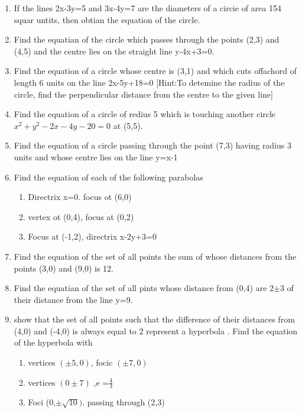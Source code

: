 \documentclass[12pt]{article}
\begin{document}
\begin{enumerate}
\item If the lines 2x-3y=5 and 3x-4y=7 are the diameters of a circie of area 154 squar untits, then obtian the equation of the circle.
\item Find the equatian of the circle which passes through the points (2,3) and (4,5) and the centre lies on the straight line y-4x+3=0.
\item Find the equation of a circle whose centre is (3,1) and which cuts offachord of length  6 units on the  line 2x-5y+18=0
[Hint:To detemine the radius of the circle, find the perpendicular distance from the centre to the given line]
\item Find the equation of a circle of redius 5 which is touching another circle $x^2+y^2-2x-4y-20=0$ at (5,5).
\item Find the equation of a circle passing through the point (7,3) having radius 3 units and whose centre lies on the line y=x-1
\item Find the equation of each of the following parabolas
\begin{enumerate}
\item  Directrix x=0. focus ot (6,0)
\item  vertex  ot (0,4), focus at (0,2)
\item  Focus at (-1,2), directrix x-2y+3=0
\end{enumerate}
\item Find the equation of the set of all points the sum of whose distances  from the points (3,0) and (9,0) is 12.
\item Find the equatian of the set of all pints whose distance from (0,4) are 2$\pm$3 of their distance from the line y=9.
\item show that the set of all points such that the difference of their distances from (4,0) and (-4,0) is always equal to 2 represent a hyperbola .
 Find the equation of the hyperbola with
 \begin{enumerate}
	 \item  vertices $(\pm5,0)$, focic $(\pm 7,0)$
	 \item vertices $(0\pm7)$ ,e =$\frac{4}{3}$ 
	 \item  Foci (0,$\pm\sqrt{10})$. passing through (2,3)
\end{enumerate}

\end{enumerate}
\end{document}
